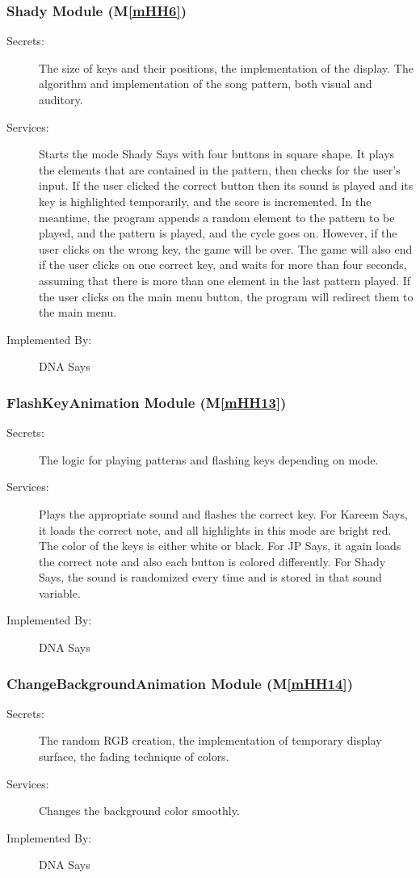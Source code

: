 \documentclass[12pt, titlepage]{article}
\newcommand{\mref}[1]{M\ref{#1}}
\begin{document}
\subsubsection{Shady Module (\mref{mHH6})}
\begin{description}
\item[Secrets:]The size of keys and their positions, the implementation of the display. The algorithm and implementation of the song pattern, both visual and auditory.
\item[Services:]Starts the mode Shady Says with four buttons in square shape. It plays the elements that are contained in the pattern, then checks for the user's input. If the user clicked the correct button then its sound is played and its key is highlighted temporarily, and the score is incremented. In the meantime, the program appends a random element to the pattern to be played, and the pattern is played, and the cycle goes on. However, if the user clicks on the wrong key, the game will be over. The game will also end if the user clicks on one correct key, and waits for more than four seconds, assuming that there is more than one element in the last pattern played. If the user clicks on the main menu button, the program will redirect them to the main menu.
\item[Implemented By:] DNA Says
\end{description}

\subsubsection{FlashKeyAnimation Module (\mref{mHH13})}
\begin{description}
\item[Secrets:]The logic for playing patterns and flashing keys depending on mode.
\item[Services:]Plays the appropriate sound and flashes the correct key. For Kareem Says, it loads the correct note, and all highlights in this mode are bright red. The color of the keys is either white or black. For JP Says, it again loads the correct note and also each button is colored differently. For Shady Says, the sound is randomized every time and is stored in that sound variable.
\item[Implemented By:] DNA Says
\end{description}

\subsubsection{ChangeBackgroundAnimation Module (\mref{mHH14})}
\begin{description}
\item[Secrets:]The random RGB creation, the implementation of temporary display surface, the fading technique of colors.
\item[Services:]Changes the background color smoothly.
\item[Implemented By:] DNA Says
\end{description}
\end{document}

